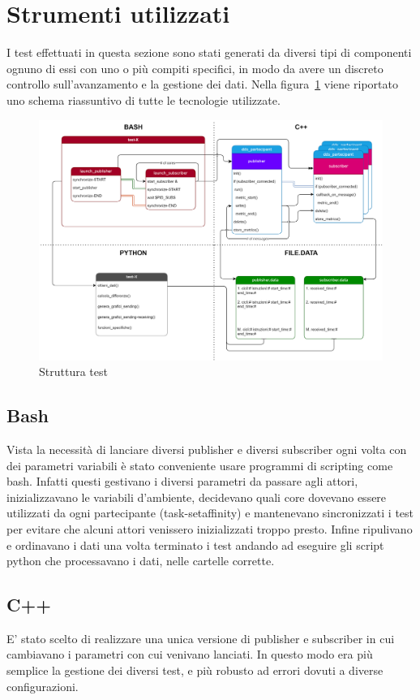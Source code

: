\section{Strumenti utilizzati}%
I test effettuati in questa sezione sono stati generati da diversi tipi di componenti ognuno di essi con uno o più compiti specifici, in modo da avere un discreto controllo sull'avanzamento e la gestione dei dati. Nella figura~\ref{fig:schema_global} viene riportato uno schema riassuntivo di tutte le tecnologie utilizzate.
\begin{figure}[H]
    \centering
    \includegraphics[width=\textwidth]{./img/schema_test_globale.drawio.png}
    \caption{Struttura test}\label{fig:schema_global}
\end{figure}

\subsection{Bash}\label{sec:Shell}
Vista la necessità di lanciare diversi publisher e diversi subscriber ogni volta con dei parametri variabili è stato conveniente usare programmi di scripting come bash. Infatti questi gestivano i diversi parametri da passare agli attori, inizializzavano le variabili d'ambiente, decidevano quali core dovevano essere utilizzati da ogni partecipante (task-setaffinity) e mantenevano sincronizzati i test per evitare che alcuni attori venissero inizializzati troppo presto. Infine ripulivano e ordinavano i dati una volta terminato i test andando ad eseguire gli script python che processavano i dati, nelle cartelle corrette.
\subsection{C++}
E' stato scelto di realizzare una unica versione di publisher e subscriber in cui cambiavano i parametri con cui venivano lanciati. In questo modo era più semplice la gestione dei diversi test, e più robusto ad errori dovuti a diverse configurazioni.
